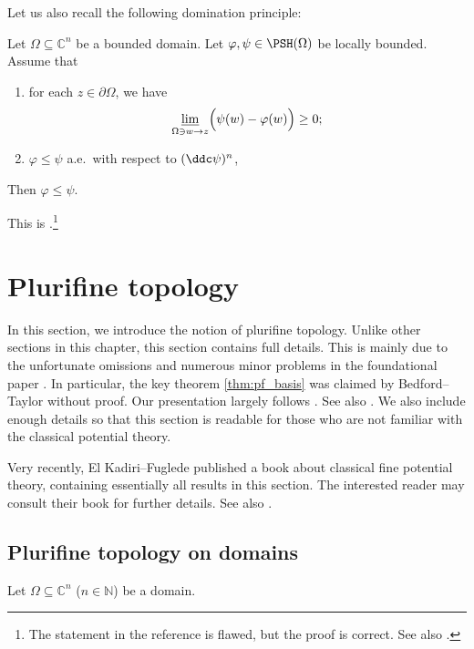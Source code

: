 Let us also recall the following domination principle:
\begin{proposition}\label{prop:dom_prin_loc}
    Let $\Omega\subseteq \mathbb{C}^n$ be a bounded domain.
    Let $\varphi,\psi\in \PSH(\Omega)$ be locally bounded. Assume that
    \begin{enumerate}
        \item\label{itm:prop:dom_prin_loc:1} for each $z\in \partial \Omega$, we have
            \[
                \varliminf_{\Omega\ni w\to z} \Bigl(\psi(w)-\varphi(w)\Bigr)\geq 0;
            \]
        \item\label{itm:prop:dom_prin_loc:2} $\varphi\leq \psi$ a.e.\ with respect to $(\ddc \psi)^n$,
    \end{enumerate}
    Then $\varphi\leq \psi$.
\end{proposition}
This is \cite[Corollary~3.31]{GZ17}.\footnote{The statement in the reference is flawed, but the proof is correct. See also \cite[Corollary~9.2.9]{FPT}.}

\section{Plurifine topology}\label{sec:plurifine}

In this section, we introduce the notion of plurifine topology. Unlike other sections in this chapter, this section contains full details. This is mainly due to the unfortunate omissions and numerous minor problems in the foundational paper \cite{BT87}. In particular, the key theorem \cref{thm:pf_basis} was claimed by Bedford--Taylor without proof. Our presentation largely follows \cite{EMW06}. See also \cite[Proposition~10.3.2 and Section~B.10]{FPT}. We also include enough details so that this section is readable for those who are not familiar with the classical potential theory.

Very recently, El Kadiri--Fuglede published a book \cite{EKF} about classical fine potential theory, containing essentially all results in this section. The interested reader may consult their book for further details. See also \cite[Chapters~5 and~10]{FPT}.

\subsection{Plurifine topology on domains}
\label{subsec:plurifine}
Let $\Omega\subseteq \mathbb{C}^n$ ($n\in \mathbb{N}$) be a domain.

